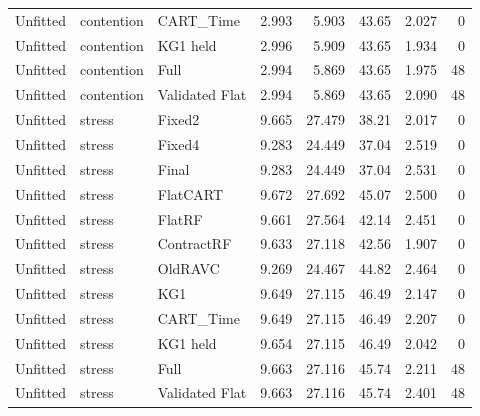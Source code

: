 \begin{longtable}{@{}lllrrrrr@{}}
Unfitted & contention & CART\_Time & 2.993 & 5.903 & 43.65 & 2.027 & 0\\
Unfitted & contention & KG1 held & 2.996 & 5.909 & 43.65 & 1.934 & 0\\
Unfitted & contention & Full & 2.994 & 5.869 & 43.65 & 1.975 & 48\\
Unfitted & contention & Validated Flat & 2.994 & 5.869 & 43.65 & 2.090 & 48\\
Unfitted & stress & Fixed2 & 9.665 & 27.479 & 38.21 & 2.017 & 0\\
Unfitted & stress & Fixed4 & 9.283 & 24.449 & 37.04 & 2.519 & 0\\
Unfitted & stress & Final & 9.283 & 24.449 & 37.04 & 2.531 & 0\\
Unfitted & stress & FlatCART & 9.672 & 27.692 & 45.07 & 2.500 & 0\\
Unfitted & stress & FlatRF & 9.661 & 27.564 & 42.14 & 2.451 & 0\\
Unfitted & stress & ContractRF & 9.633 & 27.118 & 42.56 & 1.907 & 0\\
Unfitted & stress & OldRAVC & 9.269 & 24.467 & 44.82 & 2.464 & 0\\
Unfitted & stress & KG1 & 9.649 & 27.115 & 46.49 & 2.147 & 0\\
Unfitted & stress & CART\_Time & 9.649 & 27.115 & 46.49 & 2.207 & 0\\
Unfitted & stress & KG1 held & 9.654 & 27.115 & 46.49 & 2.042 & 0\\
Unfitted & stress & Full & 9.663 & 27.116 & 45.74 & 2.211 & 48\\
Unfitted & stress & Validated Flat & 9.663 & 27.116 & 45.74 & 2.401 & 48\\
\bottomrule\end{longtable}\normalsize
